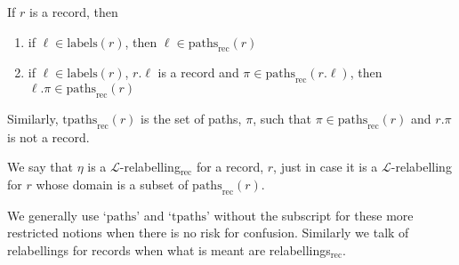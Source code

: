 If $r$ is a record, then
\begin{enumerate} 
 
\item if $\ell\in\mathrm{labels}(r)$, then $\ell\in\mathrm{paths}_{\text{rec}}(r)$ 
 
\item if $\ell\in\mathrm{labels}(r)$, $r.\ell$ is a record and
  $\pi\in\mathrm{paths}_{\text{rec}}(r.\ell)$, then $\ell.\pi\in\mathrm{paths}_{\text{rec}}(r)$
\end{enumerate}  

Similarly, $\mathrm{tpaths}_{\text{rec}}(r)$ is the set of paths,
$\pi$, such that $\pi\in\mathrm{paths}_{\text{rec}}(r)$ and $r.\pi$ is
not a record.

We say that $\eta$ is a $\mathcal{L}$-relabelling$_{\text{rec}}$ for a record,
$r$, just
in case it is a $\mathcal{L}$-relabelling for $r$ whose domain is a
subset of $\mathrm{paths}_{\text{rec}}(r)$.

We generally use `$\mathrm{paths}$' and `$\mathrm{tpaths}$' without the subscript for these
more restricted notions when there is no risk for confusion.
Similarly we talk of relabellings for records when what is meant are relabellings$_{\text{rec}}$.

